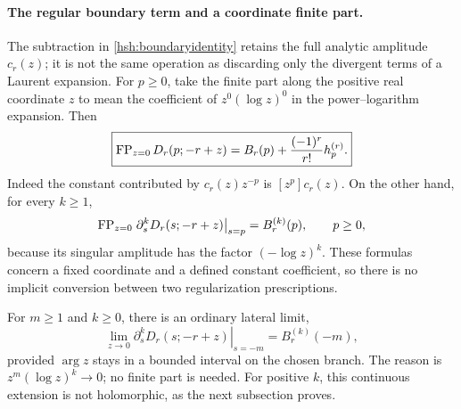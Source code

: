 \paragraph{The regular boundary term and a coordinate finite part.}
The subtraction in \eqref{hsh:boundaryidentity} retains the full
analytic amplitude $c_r(z)$; it is not the same operation as discarding
only the divergent terms of a Laurent expansion.  For $p\geq0$,
take the finite part along the positive real coordinate $z$ to mean
the coefficient of $z^0(\log z)^0$ in the power--logarithm expansion.
Then
\begin{equation}\label{hsh:FP}
 \boxed{\displaystyle
 \operatorname{FP}_{z=0}D_r(p;-r+z)=B_r(p)+\frac{(-1)^r}{r!}h_p^{(r)}.}
\end{equation}
Indeed the constant contributed by $c_r(z)z^{-p}$ is
$[z^p]c_r(z)$.  On the other hand, for every $k\geq1$,
\begin{equation}\label{hsh:FPjets}
 \operatorname{FP}_{z=0}\left.\partial_s^kD_r(s;-r+z)\right|_{s=p}
                       =B_r^{(k)}(p),\qquad p\geq0,
\end{equation}
because its singular amplitude has the factor $(-\log z)^k$.
These formulas concern a fixed coordinate and a defined constant
coefficient, so there is no implicit conversion between two
regularization prescriptions.

For $m\geq1$ and $k\geq0$, there is an ordinary lateral limit,
\begin{equation}\label{hsh:negativeboundary}
 \lim_{z\to0}\left.\partial_s^kD_r(s;-r+z)\right|_{s=-m}
                      =B_r^{(k)}(-m),
\end{equation}
provided $\arg z$ stays in a bounded interval on the chosen branch.
The reason is $z^m(\log z)^k\to0$; no finite part is needed.
For positive $k$, this continuous extension is not
holomorphic, as the next subsection proves.

